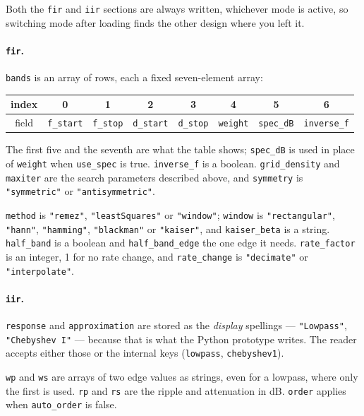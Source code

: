 \documentclass[11pt,a4paper]{article}
\newcommand{\lit}[1]{\texttt{#1}}
\begin{document}
Both the \lit{fir} and \lit{iir} sections are always written, whichever mode is
active, so switching mode after loading finds the other design where you left
it.

\paragraph{\lit{fir}.} \lit{bands} is an array of rows, each a fixed
seven-element array:

\begin{center}
\begin{tabular}{@{}cccccccc@{}}
  \toprule
  index & 0 & 1 & 2 & 3 & 4 & 5 & 6 \\
  \midrule
  field & \lit{f\_start} & \lit{f\_stop} & \lit{d\_start} & \lit{d\_stop}
        & \lit{weight} & \lit{spec\_dB} & \lit{inverse\_f} \\
  \bottomrule
\end{tabular}
\end{center}

The first five and the seventh are what the table shows; \lit{spec\_dB} is used
in place of \lit{weight} when \lit{use\_spec} is true. \lit{inverse\_f} is a
boolean. \lit{grid\_density} and \lit{maxiter} are the search parameters
described above, and \lit{symmetry} is \lit{"symmetric"} or
\lit{"antisymmetric"}.

\begin{sloppypar}
\lit{method} is \lit{"remez"}, \lit{"leastSquares"} or \lit{"window"};
\lit{window} is \lit{"rectangular"}, \lit{"hann"}, \lit{"hamming"},
\lit{"blackman"} or \lit{"kaiser"}, and \lit{kaiser\_beta} is a string.
\lit{half\_band} is a boolean and \lit{half\_band\_edge} the one edge it needs.
\lit{rate\_factor} is an integer, 1 for no rate change, and \lit{rate\_change}
is \lit{"decimate"} or \lit{"interpolate"}.
\end{sloppypar}

\paragraph{\lit{iir}.} \lit{response} and \lit{approximation} are stored as the
\emph{display} spellings --- \lit{"Lowpass"}, \lit{"Chebyshev I"} --- because
that is what the Python prototype writes. The reader accepts either those or the
internal keys (\lit{lowpass}, \lit{chebyshev1}).

\lit{wp} and \lit{ws} are arrays of two edge values as strings, even for a
lowpass, where only the first is used. \lit{rp} and \lit{rs} are the ripple and
attenuation in dB. \lit{order} applies when \lit{auto\_order} is false.
\end{document}
